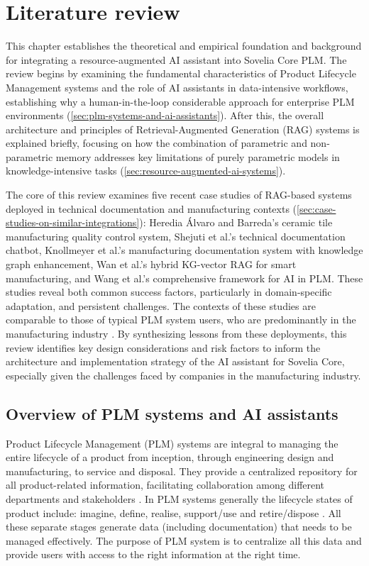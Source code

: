 \chapter{Literature review}
\label{ch:literature-review}

This chapter establishes the theoretical and empirical foundation and background for integrating a resource-augmented AI assistant into Sovelia Core PLM. The review begins by examining the fundamental characteristics of Product Lifecycle Management systems and the role of AI assistants in data-intensive workflows, establishing why a human-in-the-loop considerable approach for enterprise PLM environments (\autoref{sec:plm-systems-and-ai-assistants}). After this, the overall architecture and principles of Retrieval-Augmented Generation (RAG) systems is explained briefly, focusing on how the combination of parametric and non-parametric memory addresses key limitations of purely parametric models in knowledge-intensive tasks (\autoref{sec:resource-augmented-ai-systems}).

The core of this review examines five recent case studies of RAG-based systems deployed in technical documentation and manufacturing contexts (\autoref{sec:case-studies-on-similar-integrations}): Heredia Álvaro and Barreda's ceramic tile manufacturing quality control system, Shejuti et al.'s technical documentation chatbot, Knollmeyer et al.'s manufacturing documentation system with knowledge graph enhancement, Wan et al.'s hybrid KG-vector RAG for smart manufacturing, and Wang et al.'s comprehensive framework for AI in PLM. These studies reveal both common success factors, particularly in domain-specific adaptation, and persistent challenges. The contexts of these studies are comparable to those of typical PLM system users, who are predominantly in the manufacturing industry \parencite{stark_product_2015}. By synthesizing lessons from these deployments, this review identifies key design considerations and risk factors to inform the architecture and implementation strategy of the AI assistant for Sovelia Core, especially given the challenges faced by companies in the manufacturing industry.

\section{Overview of PLM systems and AI assistants}
\label{sec:plm-systems-and-ai-assistants}

Product Lifecycle Management (PLM) systems are integral to managing the entire lifecycle of a product from inception, through engineering design and manufacturing, to service and disposal. They provide a centralized repository for all product-related information, facilitating collaboration among different departments and stakeholders \parencite{stark_product_2015}. In PLM systems generally the lifecycle states of product include: imagine, define, realise, support/use and retire/dispose \parencite{stark_product_2015-1}. All these separate stages generate data (including documentation) that needs to be managed effectively. The purpose of PLM system is to centralize all this data and provide users with access to the right information at the right time.

